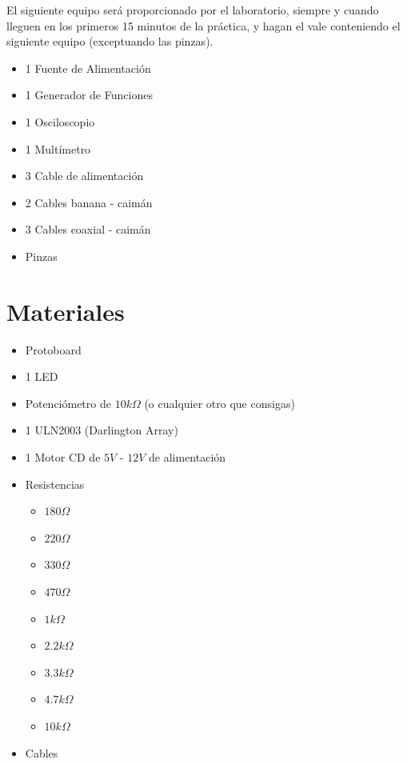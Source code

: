 	El siguiente equipo será proporcionado por el laboratorio, siempre y cuando lleguen en los primeros 15 minutos de la práctica, y hagan el vale conteniendo el siguiente equipo (exceptuando las pinzas).

	\begin{itemize}
		\item 1 Fuente de Alimentación
		\item 1 Generador de Funciones
		\item 1 Osciloscopio
		\item 1 Multímetro
		\item 3 Cable de alimentación
		\item 2 Cables banana - caimán
		\item 3 Cables coaxial - caimán
		\item Pinzas
	\end{itemize}


\section{Materiales}

	\begin{itemize}
		\item Protoboard
		\item 1 LED
		\item Potenciómetro de $10 k \Omega$ (o cualquier otro que consigas)
		\item 1 ULN2003 (Darlington Array)
		\item 1 Motor CD de $5 V$ - $12 V$ de alimentación
		\item Resistencias
		\begin{itemize}
			\item $180 \Omega$
			\item $220 \Omega$
			\item $330 \Omega$
			\item $470 \Omega$
			\item $1 k\Omega$
			\item $2.2 k\Omega$
			\item $3.3 k\Omega$
			\item $4.7 k\Omega$
			\item $10 k\Omega$
		\end{itemize}
		\item Cables
	\end{itemize}


